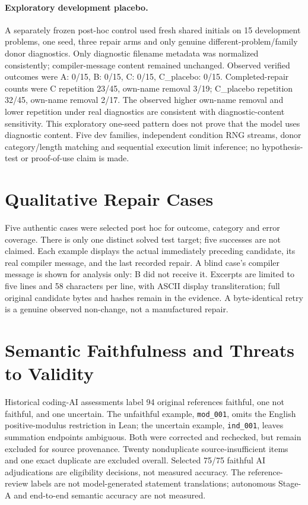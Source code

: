 \documentclass[runningheads,a4paper]{llncs}
\begin{document}
\paragraph{Exploratory development placebo.} A separately frozen post-hoc control used fresh shared initials on 15 development problems, one seed, three repair arms and only genuine different-problem/family donor diagnostics. Only diagnostic filename metadata was normalized consistently; compiler-message content remained unchanged. Observed verified outcomes were A: 0/15, B: 0/15, C: 0/15, C\_placebo: 0/15. Completed-repair counts were C repetition 23/45, own-name removal 3/19; C\_placebo repetition 32/45, own-name removal 2/17. The observed higher own-name removal and lower repetition under real diagnostics are consistent with diagnostic-content sensitivity. This exploratory one-seed pattern does not prove that the model uses diagnostic content. Five dev families, independent condition RNG streams, donor category/length matching and sequential execution limit inference; no hypothesis-test or proof-of-use claim is made.

\section{Qualitative Repair Cases}
Five authentic cases were selected post hoc for outcome, category and error
coverage. There is only one distinct solved test target; five successes are not
claimed. Each example displays the actual immediately preceding candidate,
its real compiler message, and the last recorded repair. A blind case's compiler
message is shown for analysis only: B did not receive it. Excerpts are limited
to five lines and 58 characters per line, with ASCII display transliteration;
full original candidate bytes and hashes remain in the evidence. A byte-identical
retry is a genuine observed non-change, not a manufactured repair.

\section{Semantic Faithfulness and Threats to Validity}

Historical coding-AI assessments label 94 original references faithful, one
not faithful, and one uncertain. The unfaithful example, \texttt{mod\_001},
omits the English positive-modulus restriction in Lean; the uncertain example,
\texttt{ind\_001}, leaves summation endpoints ambiguous. Both were corrected
and rechecked, but remain excluded for source provenance. Twenty nonduplicate
source-insufficient items and one exact duplicate are excluded overall. Selected
75/75 faithful AI adjudications are eligibility decisions, not measured accuracy.
The reference-review labels are not model-generated statement translations;
autonomous Stage-A and end-to-end semantic accuracy are not measured.
\end{document}
